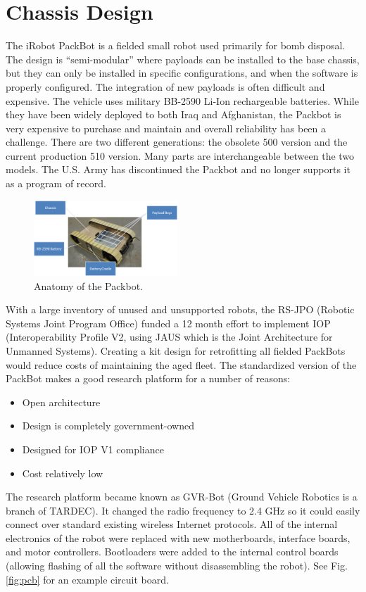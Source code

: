 \section{Chassis Design}\label{sec:chassis}

The iRobot PackBot is a fielded small robot used primarily for bomb disposal. The design is ``semi-modular'' where payloads can be installed to the base chassis, but they can only be installed in specific configurations, and when the software is properly configured. The integration of new payloads is often difficult and expensive. The vehicle uses military BB-2590 Li-Ion rechargeable batteries. While they have been widely deployed to both Iraq and Afghanistan, the Packbot is very expensive to purchase and maintain and overall reliability has been a challenge. There are two different generations: the obsolete 500 version and the current production 510 version. Many parts are interchangeable between the two models. The U.S. Army has discontinued the Packbot and no longer supports it as a program of record.

\begin{figure}
	\centering
	\includegraphics[width=0.48\textwidth]{./pictures/packbot.png}
	\caption{Anatomy of the Packbot.}
	\label{fig:packbot}
\end{figure}

With a large inventory of unused and unsupported robots, the RS-JPO (Robotic Systems Joint Program Office) funded a 12 month effort to implement IOP (Interoperability Profile V2, using JAUS which is the Joint Architecture for Unmanned Systems). Creating a kit design for retrofitting all fielded PackBots would reduce costs of maintaining the aged fleet. The standardized version of the PackBot makes a good research platform for a number of reasons:
\begin{itemize}
	\item Open architecture
	\item Design is completely government-owned
	\item Designed for IOP V1 compliance
	\item Cost relatively low
\end{itemize}
The research platform became known as GVR-Bot (Ground Vehicle Robotics is a branch of TARDEC). It changed the radio frequency to 2.4 GHz so it could easily connect over standard existing wireless Internet protocols. All of the internal electronics of the robot were replaced with new motherboards, interface boards, and motor controllers. Bootloaders were added to the internal control boards (allowing flashing of all the software without disassembling the robot). See Fig. \ref{fig:pcb} for an example circuit board.

